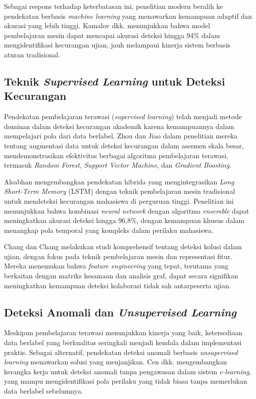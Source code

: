 Sebagai respons terhadap keterbatasan ini, penelitian modern beralih ke pendekatan berbasis \textit{machine learning} yang menawarkan kemampuan adaptif dan akurasi yang lebih tinggi. Kamalov dkk. \cite{Kamalov2021} menunjukkan bahwa model pembelajaran mesin dapat mencapai akurasi deteksi hingga 94\% dalam mengidentifikasi kecurangan ujian, jauh melampaui kinerja sistem berbasis aturan tradisional.

\subsection{Teknik \textit{Supervised Learning} untuk Deteksi Kecurangan}

Pendekatan pembelajaran terawasi (\textit{supervised learning}) telah menjadi metode dominan dalam deteksi kecurangan akademik karena kemampuannya dalam mempelajari pola dari data berlabel. Zhou dan Jiao \cite{Zhou2022} dalam penelitian mereka tentang augmentasi data untuk deteksi kecurangan dalam asesmen skala besar, mendemonstrasikan efektivitas berbagai algoritma pembelajaran terawasi, termasuk \textit{Random Forest}, \textit{Support Vector Machine}, dan \textit{Gradient Boosting}.

Alsabhan \cite{Alsabhan2023} mengembangkan pendekatan hibrida yang mengintegrasikan \textit{Long Short-Term Memory} (LSTM) dengan teknik pembelajaran mesin tradisional untuk mendeteksi kecurangan mahasiswa di perguruan tinggi. Penelitian ini menunjukkan bahwa kombinasi \textit{neural network} dengan algoritma \textit{ensemble} dapat meningkatkan akurasi deteksi hingga 96,8\%, dengan kemampuan khusus dalam menangkap pola temporal yang kompleks dalam perilaku mahasiswa.

Chang dan Chang \cite{Chang2023} melakukan studi komprehensif tentang deteksi kolusi dalam ujian, dengan fokus pada teknik pembelajaran mesin dan representasi fitur. Mereka menemukan bahwa \textit{feature engineering} yang tepat, terutama yang berkaitan dengan matriks kesamaan dan analisis graf, dapat secara signifikan meningkatkan kemampuan deteksi kolaborasi tidak sah antarpeserta ujian.

\subsection{Deteksi Anomali dan \textit{Unsupervised Learning}}

Meskipun pembelajaran terawasi menunjukkan kinerja yang baik, ketersediaan data berlabel yang berkualitas seringkali menjadi kendala dalam implementasi praktis. Sebagai alternatif, pendekatan deteksi anomali berbasis \textit{unsupervised learning} menawarkan solusi yang menjanjikan. Cen dkk. \cite{survey:anomaly_detection_edu} mengembangkan kerangka kerja untuk deteksi anomali tanpa pengawasan dalam sistem \textit{e-learning}, yang mampu mengidentifikasi pola perilaku yang tidak biasa tanpa memerlukan data berlabel sebelumnya.


